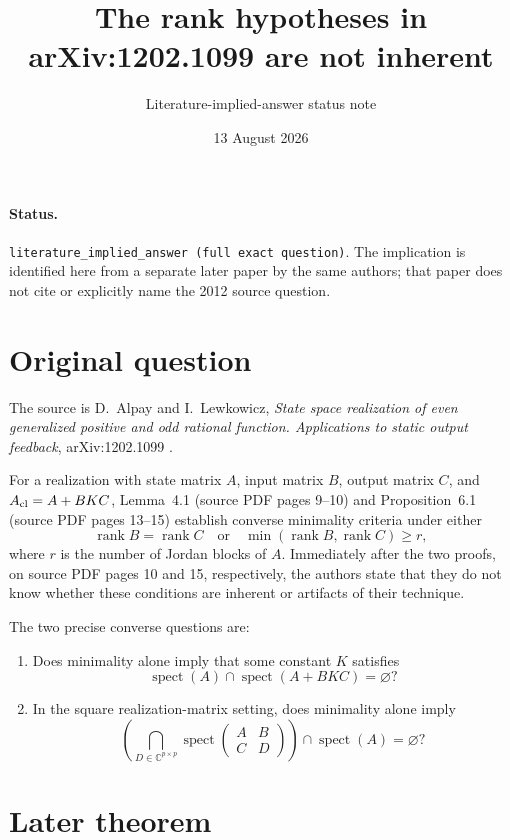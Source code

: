 \documentclass[11pt]{article}
\title{The rank hypotheses in arXiv:1202.1099 are not inherent}
\author{Literature-implied-answer status note}
\date{13 August 2026}
\newcommand{\C}{\mathbb C}
\newcommand{\spec}{\operatorname{spect}}
\begin{document}
\maketitle

\paragraph{Status.}
\texttt{literature\_implied\_answer (full exact question)}.  The implication
is identified here from a separate later paper by the same authors; that paper
does not cite or explicitly name the 2012 source question.

\section*{Original question}

The source is D.~Alpay and I.~Lewkowicz, \emph{State space realization of
even generalized positive and odd rational function. Applications to static
output feedback}, arXiv:1202.1099 \cite{source}.

For a realization with state matrix $A$, input matrix $B$, output matrix $C$,
and $A_{\rm cl}=A+BKC$, Lemma~4.1 (source PDF pages 9--10) and
Proposition~6.1 (source PDF pages 13--15) establish converse minimality
criteria under either
\[
 \operatorname{rank}B=\operatorname{rank}C
 \quad\text{or}\quad
 \min(\operatorname{rank}B,\operatorname{rank}C)\ge r,
\]
where $r$ is the number of Jordan blocks of $A$.  Immediately after the two
proofs, on source PDF pages 10 and 15, respectively, the authors state that
they do not know whether these conditions are inherent or artifacts of their
technique.

The two precise converse questions are:
\begin{enumerate}
\item Does minimality alone imply that some constant $K$ satisfies
\[
 \spec(A)\cap\spec(A+BKC)=\varnothing ?
\]
\item In the square realization-matrix setting, does minimality alone imply
\[
 \left(\bigcap_{D\in\C^{p\times p}}
   \spec\begin{pmatrix}A&B\\ C&D\end{pmatrix}\right)
   \cap\spec(A)=\varnothing ?
\]
\end{enumerate}

\section*{Later theorem}
\end{document}
